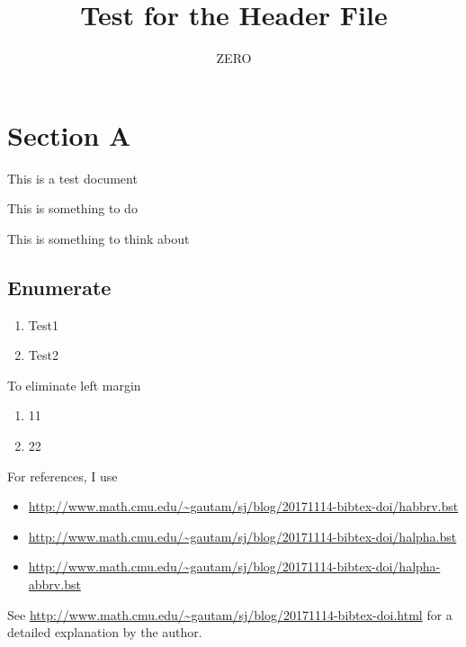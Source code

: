 


\title{Test for the Header File}
\author{ZERO}

\maketitle

\section{Section A}
This is a test document

\begin{todobox}
  This is something to do
\end{todobox}

\begin{thoughts}
  This is something to think about
\end{thoughts}

\subsection{Enumerate}
\begin{enumerate}[label=(TR\arabic*)]
\item Test1
\item Test2
\end{enumerate}

To eliminate left margin
\begin{rmk}
  \begin{enumerate}[left=0pt]
  \item 11
  \item 22
  \end{enumerate}
\end{rmk}

For references, I use
\begin{itemize}
\item \url{http://www.math.cmu.edu/~gautam/sj/blog/20171114-bibtex-doi/habbrv.bst}
\item \url{http://www.math.cmu.edu/~gautam/sj/blog/20171114-bibtex-doi/halpha.bst}
  \item \url{http://www.math.cmu.edu/~gautam/sj/blog/20171114-bibtex-doi/halpha-abbrv.bst}
  \end{itemize}
  See \url{http://www.math.cmu.edu/~gautam/sj/blog/20171114-bibtex-doi.html} for a detailed explanation by the author.
